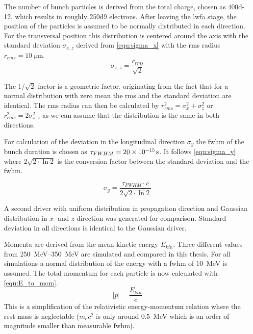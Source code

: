 \documentclass[bachelor_thesis]{subfiles}
\begin{document}
The number of bunch particles is derived from the total charge, chosen as \qty{400d-12}{\C}, which results in roughly \num{250d9} electrons. After leaving the \gls{lwfa} stage, the position of the particles is assumed to be normally distributed in each direction.
For the transversal position this distribution is centered around the axis with the standard deviation $\sigma_{x,z}$ derived from \autoref{equ:sigma_x} with the \gls{rms} radius $r_{rms}=\qty{10}{\um}$.
\begin{equation}
	\sigma_{x,z}=\frac{r_{rms}}{\sqrt{2}} 
	\label{equ:sigma_x}
\end{equation}

The $1/\sqrt{2}$ factor is a geometric factor, originating from the fact that for a normal distribution with zero mean the \gls{rms} and the standard deviation are identical. 
The \gls{rms} radius can then be calculated by $r_{rms}^2=\sigma_{x}^2 + \sigma_{z}^2$ or $r_{rms}^2=2\sigma_{x,z}^2$ as we can assume that the distribution is the same in both directions.

For calculation of the deviation in the longitudinal direction $\sigma_y$ the \gls{fwhm} of the bunch duration is chosen as $\tau_{FWHM}=\qty{20d-15}{\s}$. 
It follows \autoref{equ:sigma_y} where $2\sqrt{2\cdot\ln{2}}$ is the conversion factor between the standard deviation and the \gls{fwhm}.

\begin{equation}
	\sigma_{y}=\frac{\tau_{FWHM}\cdot c}{2\sqrt{2\cdot\ln{2}}}
	\label{equ:sigma_y}
\end{equation}

A second driver with uniform distribution in propagation direction and Gaussian distribution in $x$- and $z$-direction was generated for comparison. Standard deviation in all directions is identical to the Gaussian driver.

Momenta are derived from the mean kinetic energy $\bar{E}_{kin}$. Three different values from \qtyrange{250}{350}{\MeV} are simulated and compared in this thesis.
For all simulations a normal distribution of the energy with a \gls{fwhm} of \qty{10}{\MeV} is assumed. The total momentum for each particle is now calculated with \autoref{equ:E_to_mom}.
\begin{equation}
	\left|p\right|=\frac{E_{kin}}{c}
	\label{equ:E_to_mom}
\end{equation}
This is a simplification of the relativistic energy-momentum relation where the rest mass is neglectable ($m_{e}c^2$ is only around \qty{0.5}{\MeV} which is an order of magnitude smaller than measurable \gls{fwhm}).
\end{document}
